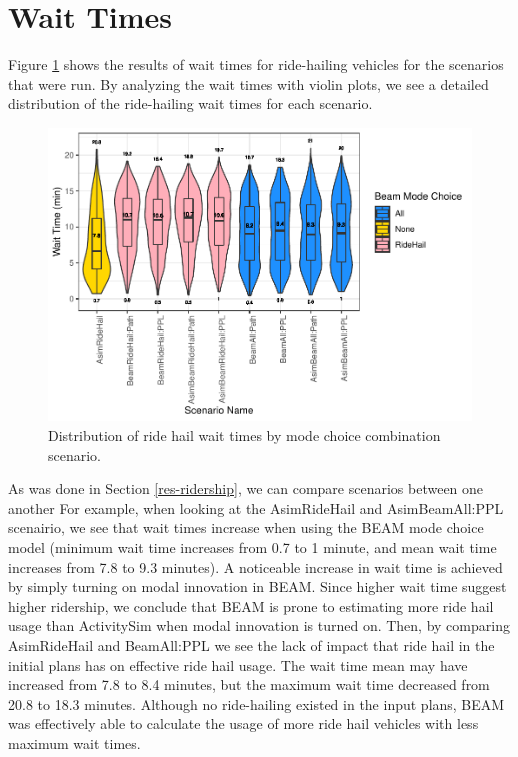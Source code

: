 \documentclass[fancy, masters]{byuthesis}
\begin{document}
\hypertarget{res-waits}{%
\section{Wait Times}\label{res-waits}}

Figure \ref{fig:waits} shows the results of wait times for ride-hailing vehicles for the scenarios that were run. By analyzing the wait times with violin plots, we see a detailed distribution of the ride-hailing wait times for each scenario.

\begin{figure}

{\centering \includegraphics{thesis_files/figure-latex/waits-1} 

}

\caption{Distribution of ride hail wait times by mode choice combination scenario.}\label{fig:waits}
\end{figure}

As was done in Section \ref{res-ridership}, we can compare scenarios between one another For example, when looking at the AsimRideHail and AsimBeamAll:PPL scenairio, we see that wait times increase when using the BEAM mode choice model (minimum wait time increases from 0.7 to 1 minute, and mean wait time increases from 7.8 to 9.3 minutes). A noticeable increase in wait time is achieved by simply turning on modal innovation in BEAM. Since higher wait time suggest higher ridership, we conclude that BEAM is prone to estimating more ride hail usage than ActivitySim when modal innovation is turned on. Then, by comparing AsimRideHail and BeamAll:PPL we see the lack of impact that ride hail in the initial plans has on effective ride hail usage. The wait time mean may have increased from 7.8 to 8.4 minutes, but the maximum wait time decreased from 20.8 to 18.3 minutes. Although no ride-hailing existed in the input plans, BEAM was effectively able to calculate the usage of more ride hail vehicles with less maximum wait times.
\end{document}
